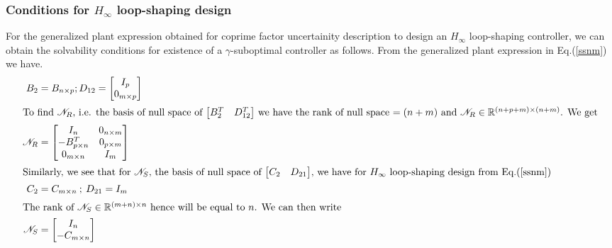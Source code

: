 \documentclass[a4paper,12pt]{article}
\begin{document}
	 	\subsubsection{Conditions for $H_{\infty}$ loop-shaping design}
	 	For the generalized plant expression obtained for coprime factor uncertainity description to design an $H_{\infty}$ loop-shaping controller, we can obtain the solvability conditions for existence of a $\gamma$-suboptimal controller as follows.
	 	From the generalized plant expression in Eq.(\ref{ssnm}) we have.
	 	\begin{align}
	 	B_{2}&=B_{n \times p} ; D_{12} = \begin{bmatrix}
	 	I_{p} \\ 0_{m \times p}
	 	\end{bmatrix} \\
	 	\intertext{To find $\mathscr{N}_{R}$, i.e. the basis of null space of $\begin{bmatrix}
	 	B_{2}^{T} & D_{12}^{T}
	 	\end{bmatrix}$ we have the rank of null space $= (n+m)$ and $\mathscr{N}_{R} \in \mathbb{R}^{(n+p+m) \times (n+m)}$. We get}
	 	\mathscr{N}_{R} &= \begin{bmatrix}
	 	I_{n} & 0_{n \times m} \\
	 	-B^{T}_{p \times n} & 0_{p \times m}\\
	 	0_{m \times n} & I_{m}
	 	\end{bmatrix}\\
	 	\intertext{Similarly, we see that for $\mathscr{N}_{S}$, the basis of null space of $\begin{bmatrix}
	 	C_{2} & D_{21}
	 	\end{bmatrix}$, we have for $H_{\infty}$ loop-shaping design from Eq.(\ref{ssnm})}
	 	C_{2}&=C_{m \times n} \: ; \: D_{21}=I_{m} \\
	 	\intertext{The rank of $\mathscr{N}_{S} \in \mathbb{R}^{(m+n) \times n}$ hence will be equal to $n$. We can then write}
	 	\mathscr{N}_{S} &= \begin{bmatrix}
	 	I_{n} \\ -C_{m \times n}
	 	\end{bmatrix}
	 	\end{align}
\end{document}
